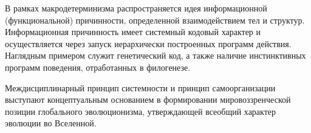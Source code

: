 \documentclass[exam_answers.tex]{subfiles}
\begin{document}
В рамках макродетерминизма распространяется идея информационной
(функциональной) причинности, определенной взаимодействием тел и
структур. Информационная причинность имеет системный кодовый характер и
осуществляется через запуск иерархически построенных программ действия.
Наглядным примером служит генетический код, а также наличие
инстинктивных программ поведения, отработанных в филогенезе.

Междисциплинарный принцип системности и принцип самоорганизации
выступают концептуальным основанием в формировании мировоззренческой
позиции глобального эволюционизма, утверждающей всеобщий характер
эволюции во Вселенной. 
\end{document}
